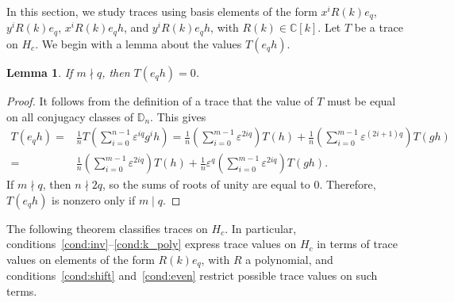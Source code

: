 \documentclass[pdftex]{sigma}
\newcommand\CC{\mathbb{C}}
\newcommand\DD{\mathbb{D}}
\newcommand\eps{\varepsilon}
\numberwithin{equation}{section}
\newtheorem{Lemma}[Theorem]{Lemma}
\theoremstyle{definition}
\begin{document}
In this section, we study traces using basis elements of the form
$x^i R(k) e_q$, $y^i R(k) e_q$, $x^i R(k) e_q h$, and $y^i R(k) e_q h$,
with $R(k) \in \CC[k]$.
Let $T$ be a trace on $H_c$.
We begin with a lemma about the values $T(e_q h)$.

\begin{Lemma}
 \label{lem:trace_eh_zero}
 If $m \nmid q$, then $T(e_q h) = 0$.
\end{Lemma}

\begin{proof}
 It follows from the definition of a trace that
 the value of $T$ must be equal
 on all conjugacy classes of $\DD_n$.
 This gives
 \begin{align*}
 T(e_q h) ={}& \frac1n T\left(
 \sum\limits_{i = 0}^{n - 1}
 \eps^{iq} g^i h \right) = \frac1n \left( \sum\limits_{i = 0}^{m - 1}
 \eps^{2iq} \right) T(h)
 + \frac1n \left( \sum\limits_{i = 0}^{m - 1}
 \eps^{(2i + 1)q} \right) T(gh) \\
 ={}& \frac1n \left( \sum\limits_{i = 0}^{m - 1}
 \eps^{2iq} \right) T(h)
 + \frac1n \eps^q \left( \sum\limits_{i = 0}^{m - 1}
 \eps^{2iq} \right) T(gh).
 \end{align*}
 If $m \nmid q$, then $n \nmid 2q$, so the sums of roots of unity
 are equal to $0$.
 Therefore, $T(e_q h)$ is nonzero only if $m \mid q$.
\end{proof}

The following theorem classifies traces on $H_c$.
In particular,
conditions~\ref{cond:inv}--\ref{cond:k_poly}
express trace values on $H_c$
in terms of trace values on elements of the form $R(k) e_q$,
with $R$ a polynomial,
and conditions~\ref{cond:shift} and~\ref{cond:even}
restrict possible trace values on such terms.
\end{document}
